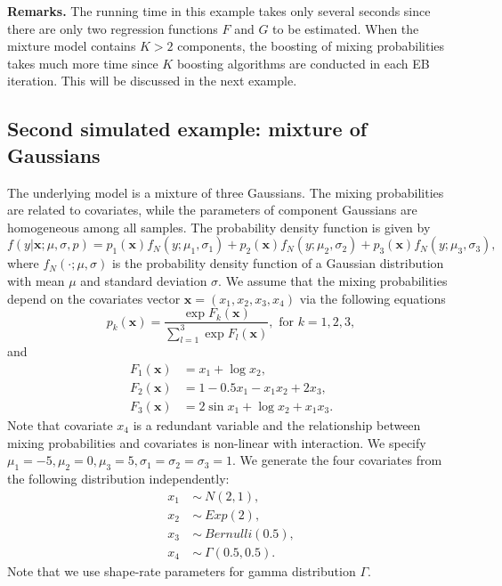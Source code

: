 \documentclass[11pt]{article}
\numberwithin{equation}{section}
\def\bx{\boldsymbol{x}}
\begin{document}
{\bf Remarks.} The running time in this example takes only several seconds since there are only two regression functions $F$ and $G$ to be estimated.
When the mixture model contains $K>2$ components, the boosting of mixing probabilities takes much more time since $K$ boosting algorithms are conducted in each EB iteration. This will be discussed in the next example.

\subsection{Second simulated example: mixture of Gaussians}

The underlying model is a mixture of three Gaussians. The mixing probabilities are related to covariates, while the parameters of component Gaussians are homogeneous among all samples.
The probability density function is given by
\begin{equation}
f(y|\bx; \mu,\sigma,p)=p_1(\bx)f_N(y;\mu_1,\sigma_1)+p_2(\bx)f_N(y;\mu_2,\sigma_2)+p_3(\bx)f_N(y;\mu_3,\sigma_3),
\end{equation}
where $f_N(\cdot;\mu,\sigma)$ is the probability density function of a Gaussian distribution with mean $\mu$ and standard deviation $\sigma$.
We assume that the mixing probabilities depend on the covariates vector $\bx=(x_1,x_2,x_3,x_4)$ via the following equations
\begin{equation}\label{logistic}
	p_k(\bx)=\frac{\exp{F_k(\bx)}}{\sum_{l=1}^{3}\exp{F_l(\bx)}}, \text{ for } k=1,2,3,
\end{equation}
and 
\begin{align*}
F_1(\bx)&=x_1+\log x_2,\\
 F_2(\bx)&=1-0.5x_1-x_1x_2+2x_3, \\
  F_3(\bx)&=2\sin x_1+\log x_2 + x_1x_3.
	\end{align*}
Note that covariate $x_4$ is a redundant variable and the relationship between mixing probabilities and covariates is non-linear with interaction. 
We specify $\mu_1=-5,\mu_2=0,\mu_3=5, \sigma_1=\sigma_2=\sigma_3=1$. We generate the four covariates from the following distribution independently:
   \begin{align*}
   	x_1~&\sim~ N(2,1),\\
   	x_2~&\sim~ Exp(2), \\
   	x_3~&\sim~ Bernulli(0.5), \\
   	x_4~&\sim~ \Gamma(0.5,0.5).
   \end{align*}
Note that we use shape-rate parameters for gamma distribution $\Gamma$.
\end{document}
